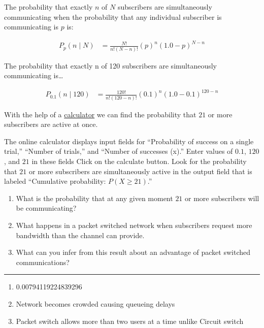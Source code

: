 \documentclass[twoside]{article}
\newenvironment{answer}
  {\vspace*{0.2cm} \rule{12cm}{0.04cm} \vspace*{0.2cm}}
  {\vspace*{0.2cm}}
\begin{document}
\begin{enumerate}
    The probability that exactly $n$ of $N$ subscribers are simultaneously communicating
    when the probability that any individual subscriber is communicating is $p$ is:

    \begin{align*}
      P_{p} (n \mid N ) & = \frac{N!}{n! (N - n)!} (p)^n (1.0 - p)^{N - n}
      \end{align*}

    The probability that exactly n of 120 subscribers are simultaneously communicating
    is\ldots

    \begin{align*}
      P_{0.1} (n \mid 120 ) & = \frac{120!}{n! (120 - n)!} (0.1)^n (1.0 - 0.1)^{120 - n}
      \end{align*}

    With the help of a \href{http://stattrek.com/online-calculator/binomial.aspx}{calculator}
    we can find the probability that $21$ or more
    subscribers are active at once.
  
    The online calculator displays input fields for ``Probability of success on a single trial,''
    ``Number of trials,'' and ``Number of successes (x).''
    Enter values of $0.1$, $120$, and $21$ in these fields
    Click on the calculate button.
    Look for the probability that $21$ or more subscribers are simultaneously active
    in the output field that is labeled ``Cumulative probability: $P(X \ge 21)$.''

    \begin{enumerate}
      \item What is the probability that at any given moment
        $21$ or more subscribers will be communicating?
      \item What happens in a packet switched network when subscribers
        request more bandwidth than the channel can provide.
      \item What can you infer from this result about an advantage
        of packet switched communications?
      \end{enumerate}

  \begin{answer}

  \begin{enumerate}
    \item 0.00794119224839296
    \item Network becomes crowded causing queueing delays
    \item Packet switch allows more than two users at a time unlike Circuit switch
    \end{enumerate}


\end{answer}
\end{enumerate}
\end{document}
